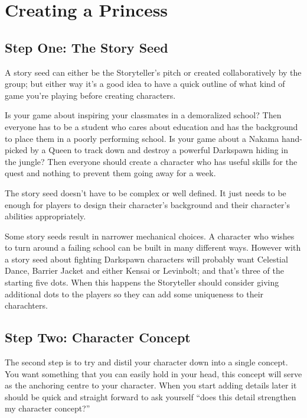 
\section*{Creating a Princess} 

\subsection*{Step One: The Story Seed} 

A story seed can either be the Storyteller's pitch or created collaboratively by the group; but either way it's a good idea to have a quick outline of what kind of game you're playing before creating characters. 

Is your game about inspiring your classmates in a demoralized school? Then everyone has to be a student who cares about education and has the background to place them in a poorly performing school. Is your game about a Nakama hand-picked by a Queen to track down and destroy a powerful Darkspawn hiding in the jungle? Then everyone should create a character who has useful skills for the quest and nothing to prevent them going away for a week.

The story seed doesn't have to be complex or well defined. It just needs to be enough for players to design their character's background and their character's abilities appropriately. 

Some story seeds result in narrower mechanical choices. A character who wishes to turn around a failing school can be built in many different ways. However with a story seed about fighting Darkspawn characters will probably want Celestial Dance, Barrier Jacket and either Kensai or Levinbolt; and that's three of the starting five dots. When this happens the Storyteller should consider giving additional dots to the players so they can add some uniqueness to their charachters.  

\subsection*{Step Two: Character Concept}

The second step is to try and distil your character down into a single concept. You want something that you can easily hold in your head, this concept will serve as the anchoring centre to your character. When you start adding details later it should be quick and straight forward to ask yourself  \textquotedblleft does this detail strengthen my character concept?\textquotedblright 

